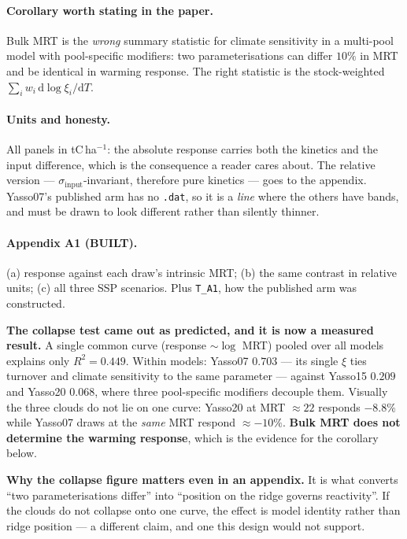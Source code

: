 \documentclass[11pt]{article}
\newcommand{\sinput}{\sigma_{\mathrm{input}}}
\begin{document}
\paragraph{\textbf{Corollary worth stating in the paper.}} Bulk MRT is the \emph{wrong} summary
statistic for climate sensitivity in a multi-pool model with pool-specific modifiers: two
parameterisations can differ $10\%$ in MRT and be identical in warming response. The right statistic
is the stock-weighted $\sum_i w_i\,\mathrm{d}\log\xi_i/\mathrm{d}T$.
\paragraph{Units and honesty.} All panels in tC\,ha$^{-1}$: the absolute response carries both the
kinetics and the input difference, which is the consequence a reader cares about. The relative
version --- $\sinput$-invariant, therefore pure kinetics --- goes to the appendix. Yasso07's
published arm has no \texttt{.dat}, so it is a \emph{line} where the others have bands, and must be
drawn to look different rather than silently thinner.

\paragraph{Appendix A1 (BUILT).} (a) response against each draw's intrinsic MRT; (b) the same
contrast in relative units; (c) all three SSP scenarios. Plus \texttt{T\_A1}, how the published arm
was constructed.

\begin{note}
\textbf{The collapse test came out as predicted, and it is now a measured result.} A single common
curve (response $\sim \log$ MRT) pooled over all models explains only $R^2 = 0.449$. Within models:
Yasso07 $\mathbf{0.703}$ --- its single $\xi$ ties turnover and climate sensitivity to the same
parameter --- against Yasso15 $0.209$ and Yasso20 $\mathbf{0.068}$, where three pool-specific
modifiers decouple them. Visually the three clouds do not lie on one curve: Yasso20 at
MRT $\approx 22$ responds $-8.8\%$ while Yasso07 draws at the \emph{same} MRT respond $\approx
-10\%$. \textbf{Bulk MRT does not determine the warming response}, which is the evidence for the
corollary below.
\end{note}

\begin{note}
\textbf{Why the collapse figure matters even in an appendix.} It is what converts ``two
parameterisations differ'' into ``position on the ridge governs reactivity''. If the clouds do not
collapse onto one curve, the effect is model identity rather than ridge position --- a different
claim, and one this design would not support.
\end{note}
\end{document}
